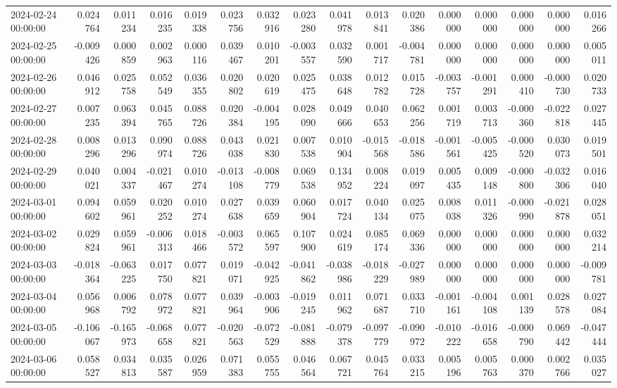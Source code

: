 \begin{tabular}{lrrrrrrrrrrrrrrr}
2024-02-24 00:00:00 & 0.024764 & 0.011234 & 0.016235 & 0.019338 & 0.023756 & 0.032916 & 0.023280 & 0.041978 & 0.013841 & 0.020386 & 0.000000 & 0.000000 & 0.000000 & 0.000000 & 0.016266 \\
2024-02-25 00:00:00 & -0.009426 & 0.000859 & 0.002963 & 0.000116 & 0.039467 & 0.010201 & -0.003557 & 0.032590 & 0.001717 & -0.004781 & 0.000000 & 0.000000 & 0.000000 & 0.000000 & 0.005011 \\
2024-02-26 00:00:00 & 0.046912 & 0.025758 & 0.052549 & 0.036355 & 0.020802 & 0.020619 & 0.025475 & 0.038648 & 0.012782 & 0.015728 & -0.003757 & -0.001291 & 0.000410 & -0.000730 & 0.020733 \\
2024-02-27 00:00:00 & 0.007235 & 0.063394 & 0.045765 & 0.088726 & 0.020384 & -0.004195 & 0.028090 & 0.049666 & 0.040653 & 0.062256 & 0.001719 & 0.003713 & -0.000360 & -0.022818 & 0.027445 \\
2024-02-28 00:00:00 & 0.008296 & 0.013296 & 0.090974 & 0.088726 & 0.043038 & 0.021830 & 0.007538 & 0.010904 & -0.015568 & -0.018586 & -0.001561 & -0.005425 & -0.000520 & 0.030073 & 0.019501 \\
2024-02-29 00:00:00 & 0.040021 & 0.004337 & -0.021467 & 0.010274 & -0.013108 & -0.008779 & 0.069538 & 0.134952 & 0.008224 & 0.019097 & 0.005435 & 0.009148 & -0.000800 & -0.032306 & 0.016040 \\
2024-03-01 00:00:00 & 0.094602 & 0.059961 & 0.020252 & 0.010274 & 0.027638 & 0.039659 & 0.060904 & 0.017724 & 0.040134 & 0.025075 & 0.008038 & 0.011326 & -0.000990 & -0.021878 & 0.028051 \\
2024-03-02 00:00:00 & 0.029824 & 0.059961 & -0.006313 & 0.018466 & -0.003572 & 0.065597 & 0.107900 & 0.024619 & 0.085174 & 0.069336 & 0.000000 & 0.000000 & 0.000000 & 0.000000 & 0.032214 \\
2024-03-03 00:00:00 & -0.018364 & -0.063225 & 0.017750 & 0.077821 & 0.019071 & -0.042925 & -0.041862 & -0.038986 & -0.018229 & -0.027989 & 0.000000 & 0.000000 & 0.000000 & 0.000000 & -0.009781 \\
2024-03-04 00:00:00 & 0.056968 & 0.006792 & 0.078972 & 0.077821 & 0.039964 & -0.003906 & -0.019245 & 0.011962 & 0.071687 & 0.033710 & -0.001161 & -0.004108 & 0.001139 & 0.028578 & 0.027084 \\
2024-03-05 00:00:00 & -0.106067 & -0.165973 & -0.068658 & 0.077821 & -0.020563 & -0.072529 & -0.081888 & -0.079378 & -0.097779 & -0.090972 & -0.010222 & -0.016658 & -0.000790 & 0.069442 & -0.047444 \\
2024-03-06 00:00:00 & 0.058527 & 0.034813 & 0.035587 & 0.026959 & 0.071383 & 0.055755 & 0.046564 & 0.067721 & 0.045764 & 0.033215 & 0.005196 & 0.005763 & 0.000370 & 0.002766 & 0.035027 \\

\end{tabular}
